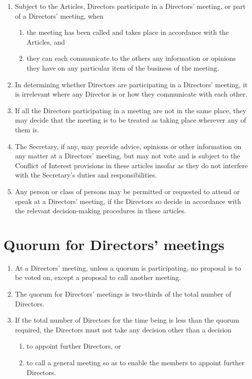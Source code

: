 \documentclass[a4paper,12pt]{article}
\begin{document}
\begin{enumerate}
  \item Subject to the Articles, Directors participate in a Directors' meeting, or part of a Directors' meeting, when
  \begin{enumerate}
    \item the meeting has been called and takes place in accordance with the Articles, and
    \item they can each communicate to the others any information or opinions they have on any particular item of the business of the meeting.
  \end{enumerate}
  \item In determining whether Directors are participating in a Directors' meeting, it is irrelevant where any Director is or how they communicate with each other.
  \item If all the Directors participating in a meeting are not in the same place, they may decide that the meeting is to be treated as taking place wherever any of them is.
  \item The Secretary, if any, may provide advice, opinions or other information on any matter at a Directors' meeting, but may not vote and is subject to the Conflict of Interest provisions in these articles insofar as they do not interfere with the Secretary's duties and responsibilities.
  \item Any person or class of persons may be permitted or requested to attend or speak at a Directors' meeting, if the Directors so decide in accordance with the relevant decision-making procedures in these articles.
\end{enumerate}

\section{Quorum for Directors' meetings}

\begin{enumerate}
  \item At a Directors' meeting, unless a quorum is participating, no proposal is to be voted on, except a proposal to call another meeting.
  \item The quorum for Directors' meetings is two-thirds of the total number of Directors.
  \item If the total number of Directors for the time being is less than the quorum required, the Directors must not take any decision other than a decision
  \begin{enumerate}
    \item to appoint further Directors, or
    \item to call a general meeting so as to enable the members to appoint further Directors.
  \end{enumerate}
\end{enumerate}
\end{document}
